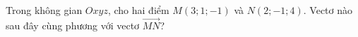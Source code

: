 \begin{ex}
Trong không gian $Oxyz$, cho hai điểm $M(3;1;-1)$ và $N(2;-1;4)$. Vectơ nào sau đây cùng phương với vectơ $\overrightarrow{MN}$?
\end{ex}
